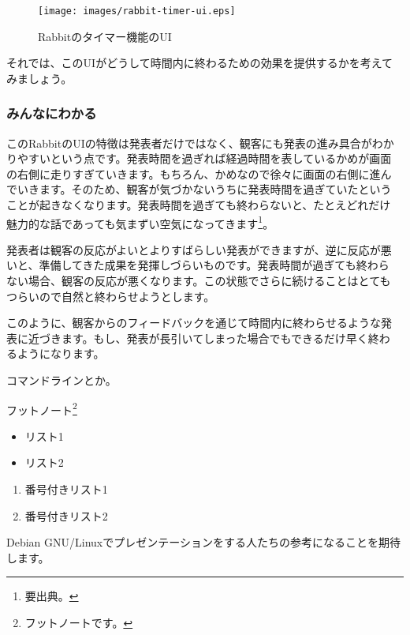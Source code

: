 \documentclass[mingoth,a4paper]{jsarticle}
\begin{document}
\begin{figure}[ht]
  \begin{center}
    \texttt{[image: images/rabbit-timer-ui.eps]}
  \end{center}
  \caption{Rabbitのタイマー機能のUI}
  \label{fig:rabbit-timer-ui}
\end{figure}

それでは、このUIがどうして時間内に終わるための効果を提供するかを考えて
みましょう。

\subsubsection{みんなにわかる}

このRabbitのUIの特徴は発表者だけではなく、観客にも発表の進み具合がわか
りやすいという点です。発表時間を過ぎれば経過時間を表しているかめが画面
の右側に走りすぎていきます。もちろん、かめなので徐々に画面の右側に進ん
でいきます。そのため、観客が気づかないうちに発表時間を過ぎていたという
ことが起きなくなります。発表時間を過ぎても終わらないと、たとえどれだけ
魅力的な話であっても気まずい空気になってきます\footnote{要出典。}。

発表者は観客の反応がよいとよりすばらしい発表ができますが、逆に反応が悪
いと、準備してきた成果を発揮しづらいものです。発表時間が過ぎても終わら
ない場合、観客の反応が悪くなります。この状態でさらに続けることはとても
つらいので自然と終わらせようとします。

このように、観客からのフィードバックを通じて時間内に終わらせるような発
表に近づきます。もし、発表が長引いてしまった場合でもできるだけ早く終わ
るようになります。

\begin{commandline}
コマンドラインとか。
\end{commandline}

フットノート\footnote{フットノートです。}

\begin{itemize}
\item リスト1
\item リスト2
\end{itemize}


\begin{enumerate}
\item 番号付きリスト1
\item 番号付きリスト2
\end{enumerate}

Debian GNU/Linuxでプレゼンテーションをする人たちの参考になることを期待
します。
\end{document}
